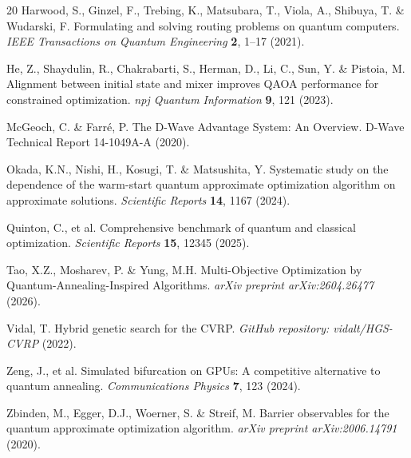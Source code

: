 \documentclass[11pt,a4paper]{article}
\theoremstyle{definition}
\begin{document}
\begin{thebibliography}{20}
Harwood, S., Ginzel, F., Trebing, K., Matsubara, T., Viola, A., Shibuya, T. \& Wudarski, F.
Formulating and solving routing problems on quantum computers.
\emph{IEEE Transactions on Quantum Engineering} \textbf{2}, 1--17 (2021).

He, Z., Shaydulin, R., Chakrabarti, S., Herman, D., Li, C., Sun, Y. \& Pistoia, M.
Alignment between initial state and mixer improves QAOA performance for constrained optimization.
\emph{npj Quantum Information} \textbf{9}, 121 (2023).

McGeoch, C. \& Farr\'{e}, P.
The D-Wave Advantage System: An Overview.
D-Wave Technical Report 14-1049A-A (2020).

Okada, K.N., Nishi, H., Kosugi, T. \& Matsushita, Y.
Systematic study on the dependence of the warm-start quantum approximate optimization algorithm on approximate solutions.
\emph{Scientific Reports} \textbf{14}, 1167 (2024).

Quinton, C., et al.
Comprehensive benchmark of quantum and classical optimization.
\emph{Scientific Reports} \textbf{15}, 12345 (2025).

Tao, X.Z., Mosharev, P. \& Yung, M.H.
Multi-Objective Optimization by Quantum-Annealing-Inspired Algorithms.
\emph{arXiv preprint arXiv:2604.26477} (2026).

Vidal, T.
Hybrid genetic search for the CVRP.
\emph{GitHub repository: vidalt/HGS-CVRP} (2022).

Zeng, J., et al.
Simulated bifurcation on GPUs: A competitive alternative to quantum annealing.
\emph{Communications Physics} \textbf{7}, 123 (2024).

Zbinden, M., Egger, D.J., Woerner, S. \& Streif, M.
Barrier observables for the quantum approximate optimization algorithm.
\emph{arXiv preprint arXiv:2006.14791} (2020).

\end{thebibliography}
\end{document}
